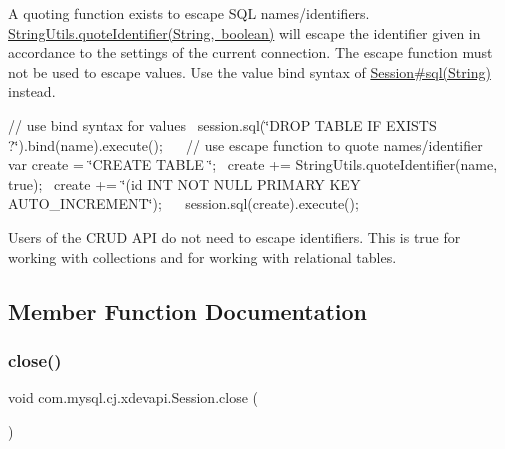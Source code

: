 A quoting function exists to escape S\+QL names/identifiers. \mbox{\hyperlink{classcom_1_1mysql_1_1cj_1_1util_1_1_string_utils_a5ed6d2efb949820c7dc4f24321a42ce6}{String\+Utils.\+quote\+Identifier(\+String, boolean)}} will escape the identifier given in accordance to the settings of the current connection. The escape function must not be used to escape values. Use the value bind syntax of \mbox{\hyperlink{interfacecom_1_1mysql_1_1cj_1_1xdevapi_1_1_session_a4409e5c0f5917851f9875342b8d38b18}{Session\#sql(\+String)}} instead. 

// use bind syntax for values~\newline
 session.\+sql(\char`\"{}\+D\+R\+O\+P T\+A\+B\+L\+E I\+F E\+X\+I\+S\+T\+S ?\char`\"{}).bind(name).execute();~\newline
 ~\newline
 // use escape function to quote names/identifier~\newline
 var create = \char`\"{}\+C\+R\+E\+A\+T\+E T\+A\+B\+L\+E \char`\"{};~\newline
 create += String\+Utils.\+quote\+Identifier(name, true);~\newline
 create += \char`\"{}(id I\+N\+T N\+O\+T N\+U\+L\+L P\+R\+I\+M\+A\+R\+Y K\+E\+Y A\+U\+T\+O\+\_\+\+I\+N\+C\+R\+E\+M\+E\+N\+T\char`\"{});~\newline
 ~\newline
 session.\+sql(create).execute(); 

Users of the C\+R\+UD A\+PI do not need to escape identifiers. This is true for working with collections and for working with relational tables. 

\subsection{Member Function Documentation}
\mbox{\label{interfacecom_1_1mysql_1_1cj_1_1xdevapi_1_1_session_a20f640c1ca28e28d415a1927cbd67ee5}} 
\subsubsection{\texorpdfstring{close()}{close()}}
{\footnotesize\ttfamily void com.\+mysql.\+cj.\+xdevapi.\+Session.\+close (\begin{DoxyParamCaption}{ }\end{DoxyParamCaption})}

